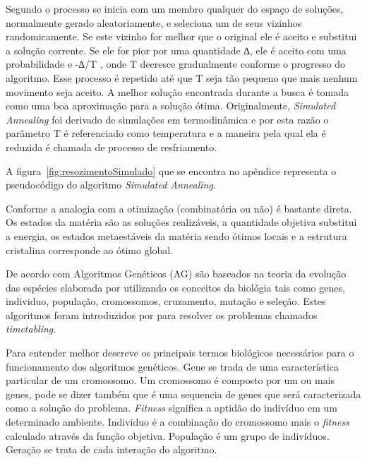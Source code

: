 Segundo \cite{souza2002experiencias} o processo se inicia com um membro qualquer do espaço de soluções, normalmente gerado aleatoriamente, e seleciona um de seus vizinhos randomicamente. Se este vizinho for melhor que o original ele é aceito e substitui a solução corrente. Se ele for pior por uma quantidade ∆, ele é aceito com uma probabilidade e -∆/T , onde T decresce gradualmente conforme o progresso do algoritmo. Esse processo é repetido até que T seja tão pequeno que mais nenhum movimento seja aceito. A melhor solução encontrada durante a busca é tomada como uma boa aproximação para a solução ótima. Originalmente, \textit{Simulated Annealing} foi derivado de simulações em termodinâmica e por esta razão o parâmetro T é referenciado como temperatura e a maneira pela qual ela é reduzida é chamada de processo de resfriamento.


A figura~\ref{fig:resozimentoSimulado} que se encontra no apêndice representa o pseudocódigo do algoritmo \textit{Simulated Annealing}.

Conforme \cite{aarts1988simulated} a analogia com a otimização (combinatória ou não) é bastante direta. Os estados da matéria são as soluções realizáveis, a quantidade objetiva substitui a energia, os estados metaestáveis da matéria sendo ótimos locais e a estrutura cristalina corresponde ao ótimo global.\par 


De acordo com \cite{goldberg1989genetic} Algoritmos Genéticos (AG) são baseados na teoria da evolução das espécies elaborada por \cite{darwin1968origin} utilizando os conceitos da biológia tais como genes, individuo, população, cromossomos, cruzamento, mutação e seleção. Estes algoritmos foram introduzidos por \cite{holland1975adaptation} para resolver os problemas chamados \textit{timetabling}.

Para entender melhor \cite{mitchell1998introduction} descreve os principais termos biológicos necessários para o funcionamento dos algoritmos genéticos. Gene se trada de uma característica particular de um cromossomo. Um cromossomo é composto por um ou mais genes, pode se dizer também que é uma sequencia de genes que será caracterizada como a solução do problema. \textit{Fitness} significa a aptidão do indivíduo em um determinado ambiente. Individuo é a combinação do cromossomo mais o \textit{fitness} calculado através da função objetiva. População é um grupo de indivíduos. Geração se trata de cada interação do algoritmo.\par

